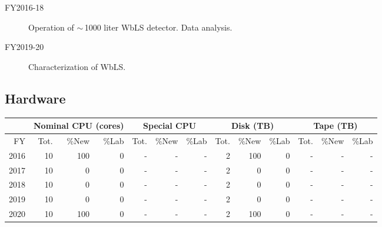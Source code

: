 \documentclass[pdftex,12pt,letter]{article}
\begin{document}
\begin{description}

\item[FY2016-18] Operation of $\sim$\,1000 liter WbLS detector. Data analysis.
                \item [FY2019-20] Characterization of WbLS. 
\end{description}

\subsection{Hardware}

\begin{tabular}[h]{|r || r|r|r || r|r|r || r|r|r || r|r|r ||}
  \hline
   & \multicolumn{3}{c||}{Nominal CPU (cores)} & \multicolumn{3}{c||}{Special CPU} & \multicolumn{3}{c||}{Disk (TB)} & \multicolumn{3}{c||}{Tape (TB)} \\
   \hline
  FY & Tot. & \%New & \%Lab & Tot. & \%New & \%Lab & Tot. & \%New & \%Lab & Tot. & \%New & \%Lab \\
  \hline
  2016 & 10 & 100& 0&- &- &- & 2& 100 & 0&- &- &- \\
  \hline
  2017 & 10&    0& 0&- &- &- & 2& 0& 0&- &- &-  \\
  \hline
  2018 & 10&    0& 0&- &- &- & 2& 0& 0&- &- &-  \\
  \hline
  2019 & 10&    0& 0&- &- &- & 2& 0& 0&- &- &-  \\
  \hline
  2020 & 10&  100& 0&- &- &- & 2& 100& 0&- &- &-  \\
  \hline
\end{tabular}
\end{document}
